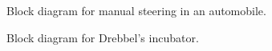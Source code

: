 \begin{figure}
   \begin{center}
      \begin{small}
         
      \end{small}
      \caption{Block diagram for manual steering in an automobile.}
      \label{fig:manual-steering}
   \end{center}
\end{figure}

\begin{figure}
   \begin{center}
      \begin{small}
         
      \end{small}
      \caption{Block diagram for Drebbel's incubator.}
      \label{fig:incubator}
   \end{center}
\end{figure}

